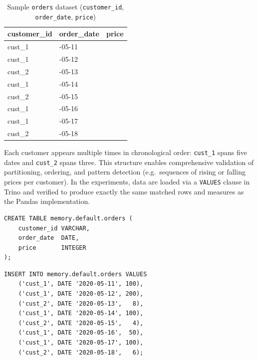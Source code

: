 \begin{table}[H]
  \centering
  \caption{Sample \texttt{orders} dataset
    (\texttt{customer\_id}, \texttt{order\_date}, \texttt{price})}
  \label{tab:orders}
  \begin{tabularx}{\textwidth}{|>{\centering\arraybackslash}X|>{\centering\arraybackslash}X|>{\centering\arraybackslash}X|}
    \hline
    \textbf{customer\_id} & \textbf{order\_date} & \textbf{price} \\
    \hline
    cust\_1 & 2020-05-11 & 100 \\
    cust\_1 & 2020-05-12 & 200 \\
    cust\_2 & 2020-05-13 &   8 \\
    cust\_1 & 2020-05-14 & 100 \\
    cust\_2 & 2020-05-15 &   4 \\
    cust\_1 & 2020-05-16 &  50 \\
    cust\_1 & 2020-05-17 & 100 \\
    cust\_2 & 2020-05-18 &   6 \\
    \hline
  \end{tabularx}
\end{table}

Each customer appears multiple times in chronological order:
\texttt{cust\_1} spans five dates and \texttt{cust\_2} spans three.
This structure enables comprehensive validation of partitioning,
ordering, and pattern detection (e.g.\ sequences of rising or
falling prices per customer).  In the experiments, data are loaded
via a \texttt{VALUES} clause in Trino and verified to produce
exactly the same matched rows and measures as the Pandas
implementation.

\begin{lstlisting}[basicstyle=\ttfamily\small,
  backgroundcolor=\color{gray!10},
  caption={Creating the in-memory table in Trino}]
CREATE TABLE memory.default.orders (
    customer_id VARCHAR,
    order_date  DATE,
    price       INTEGER
);
\end{lstlisting}

\begin{lstlisting}[basicstyle=\ttfamily\small,
  backgroundcolor=\color{gray!10},
  caption={Inserting data into the table}]
INSERT INTO memory.default.orders VALUES
    ('cust_1', DATE '2020-05-11', 100),
    ('cust_1', DATE '2020-05-12', 200),
    ('cust_2', DATE '2020-05-13',   8),
    ('cust_1', DATE '2020-05-14', 100),
    ('cust_2', DATE '2020-05-15',   4),
    ('cust_1', DATE '2020-05-16',  50),
    ('cust_1', DATE '2020-05-17', 100),
    ('cust_2', DATE '2020-05-18',   6);
\end{lstlisting}

